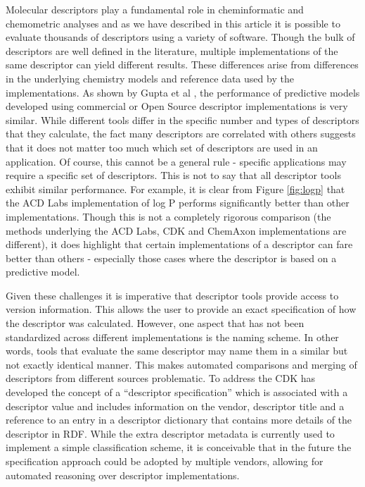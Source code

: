 \documentclass[letterpaper, 12pt]{article}
\begin{document}
Molecular descriptors play a fundamental role in cheminformatic and
chemometric analyses and as we have described in this article it is
possible to evaluate thousands of descriptors using a variety of
software. Though the bulk of descriptors are well defined in the
literature, multiple implementations of the same descriptor can yield
different results. These differences arise from differences in the
underlying chemistry models and reference data used by the
implementations. As shown by Gupta et al \cite{Gupta:2010uq},
the performance of predictive models developed using commercial or
Open Source descriptor implementations is very similar. While
different tools differ in the specific number and types of descriptors
that they calculate, the fact many descriptors are correlated with
others suggests that it does not matter too much which set of
descriptors are used in an application. Of course, this cannot be a
general rule - specific applications may require a specific set of
descriptors. This is not to say that all descriptor tools exhibit
similar performance. For example, it is clear from Figure \ref{fig:logp}
that the ACD Labs implementation of log P performs significantly
better than other implementations. Though this is not a completely
rigorous comparison (the methods underlying the ACD Labs, CDK and
ChemAxon implementations are different), it does highlight that
certain implementations of a descriptor can fare better than others -
especially those cases where the descriptor is based on a predictive
model. 

Given these challenges it is imperative that descriptor tools provide
access to version information. This allows the user to provide an
exact specification of how the descriptor was calculated. However, one
aspect that has not been standardized across different implementations
is the naming scheme. In other words, tools that evaluate the same
descriptor may name them in a similar but not exactly identical
manner. This makes automated comparisons and merging of descriptors
from different sources problematic. To address the CDK has developed
the concept of a ``descriptor specification'' which is associated with
a descriptor value and includes information on the vendor, descriptor
title and a reference to an entry in a descriptor dictionary that
contains more details of the descriptor in RDF. While the extra
descriptor metadata is currently used to implement a simple
classification scheme, it is conceivable that in the future the
specification approach could be adopted by multiple vendors, allowing
for automated reasoning over descriptor implementations.
\end{document}

